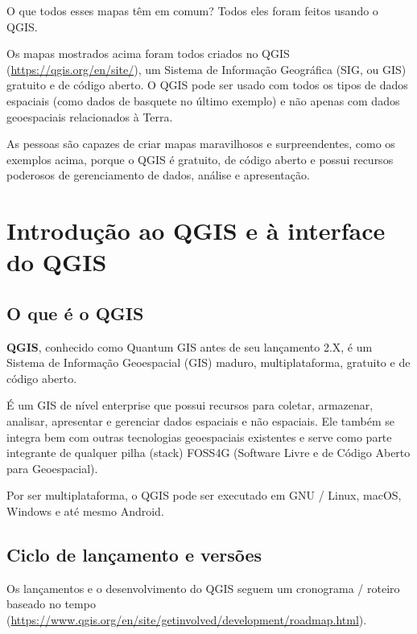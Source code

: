\documentclass[
  portuguese,
]{krantz}
\begin{document}
O que todos esses mapas têm em comum? Todos eles foram feitos usando o QGIS.

Os mapas mostrados acima foram todos criados no QGIS (\url{https://qgis.org/en/site/}), um Sistema de Informação Geográfica (SIG, ou GIS) gratuito e de código aberto. O QGIS pode ser usado com todos os tipos de dados espaciais (como dados de basquete no último exemplo) e não apenas com dados geoespaciais relacionados à Terra.

As pessoas são capazes de criar mapas maravilhosos e surpreendentes, como os exemplos acima, porque o QGIS é gratuito, de código aberto e possui recursos poderosos de gerenciamento de dados, análise e apresentação.

\hypertarget{introduuxe7uxe3o-ao-qgis-e-uxe0-interface-do-qgis}{%
\section{Introdução ao QGIS e à interface do QGIS}\label{introduuxe7uxe3o-ao-qgis-e-uxe0-interface-do-qgis}}

\hypertarget{o-que-uxe9-o-qgis}{%
\subsection{\texorpdfstring{\textbf{O que é o QGIS}}{O que é o QGIS}}\label{o-que-uxe9-o-qgis}}

\textbf{QGIS}, conhecido como Quantum GIS antes de seu lançamento 2.X, é um Sistema de Informação Geoespacial (GIS) maduro, multiplataforma, gratuito e de código aberto.

É um GIS de nível enterprise que possui recursos para coletar, armazenar, analisar, apresentar e gerenciar dados espaciais e não espaciais. Ele também se integra bem com outras tecnologias geoespaciais existentes e serve como parte integrante de qualquer pilha (stack) FOSS4G (Software Livre e de Código Aberto para Geoespacial).

Por ser multiplataforma, o QGIS pode ser executado em GNU / Linux, macOS, Windows e até mesmo Android.

\hypertarget{ciclo-de-lanuxe7amento-e-versuxf5es}{%
\subsection{\texorpdfstring{\textbf{Ciclo de lançamento e versões}}{Ciclo de lançamento e versões}}\label{ciclo-de-lanuxe7amento-e-versuxf5es}}

Os lançamentos e o desenvolvimento do QGIS seguem um cronograma / roteiro baseado no tempo (\href{https://www.qgis.org/en/site/\%20getinvolved\%20/\%20development\%20/\%20roadmap.html}{https://www.qgis.org/en/site/getinvolved/development/roadmap.html}).
\end{document}
